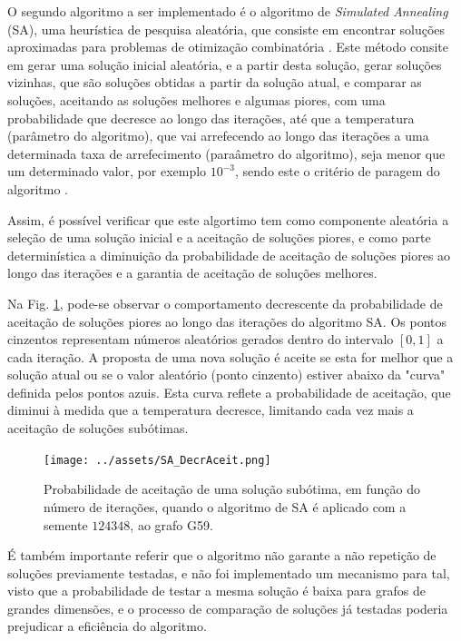 \documentclass[mirror, portugues]{revdetua}
\begin{document}
O segundo algoritmo a ser implementado é o algoritmo de \textit{Simulated Annealing} (SA), uma heurística de pesquisa aleatória, que consiste em encontrar soluções aproximadas para problemas de otimização combinatória \cite{SAT15}. Este método consite em gerar uma solução inicial aleatória, e a partir desta solução, gerar soluções vizinhas, que são soluções obtidas a partir da solução atual, e comparar as soluções, aceitando as soluções melhores e algumas piores, com uma probabilidade que decresce ao longo das iterações, até que a temperatura (parâmetro do algoritmo), que vai arrefecendo ao longo das iterações a uma determinada taxa de arrefecimento (paraâmetro do algoritmo), seja menor que um determinado valor, por exemplo $10^{-3}$, sendo este o critério de paragem do algoritmo \cite{SA87}.

Assim, é possível verificar que este algortimo tem como componente aleatória a seleção de uma solução inicial e a aceitação de soluções piores, e como parte determinística a diminuição da probabilidade de aceitação de soluções piores ao longo das iterações e a garantia de aceitação de soluções melhores.

Na Fig. \ref{fig:sa_aceitacao}, pode-se observar o comportamento decrescente da probabilidade de aceitação de soluções piores ao longo das iterações do algoritmo SA. Os pontos cinzentos representam números aleatórios gerados dentro do intervalo $[0,1]$ a cada iteração. A proposta de uma nova solução é aceite se esta for melhor que a solução atual ou se o valor aleatório (ponto cinzento) estiver abaixo da "curva" definida pelos pontos azuis. Esta curva reflete a probabilidade de aceitação, que diminui à medida que a temperatura decresce, limitando cada vez mais a aceitação de soluções subótimas.

\begin{figure}[H]
    \centering
    \texttt{[image: ../assets/SA\_DecrAceit.png]}
    \caption{Probabilidade de aceitação de uma solução subótima, em função do número de iterações, quando o algoritmo de SA é aplicado com a semente $124348$, ao grafo G59.}
    \label{fig:sa_aceitacao}
\end{figure}

É também importante referir que o algoritmo não garante a não repetição de soluções previamente testadas, e não foi implementado um mecanismo para tal, visto que a probabilidade de testar a mesma solução é baixa para grafos de grandes dimensões, e o processo de comparação de soluções já testadas poderia prejudicar a eficiência do algoritmo.
\end{document}
